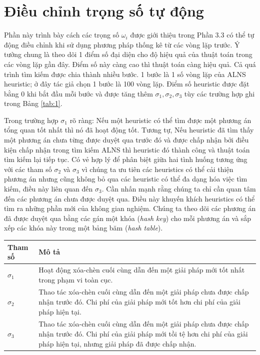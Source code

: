 \section{Điều chỉnh trọng số tự động}
Phần này trình bày cách các trọng số $\omega_i$ được giới thiệu trong Phần 3.3 có thể tự động điều chỉnh khi sử dụng phương pháp thống kê từ các vòng lặp trước. Ý tưởng chung là theo dõi 1 điểm số đại diện cho độ hiệu quả của thuật toán trong các vòng lặp gần đây. Điểm số này càng cao thì thuật toán càng hiệu quả. Cả quá trình tìm kiếm được chia thành nhiều bước. 1 bước là 1 số vòng lặp của ALNS heuristic; ở đây tác giả chọn 1 bước là 100 vòng lặp. Điểm số heuristic được đặt bằng 0 khi bắt đầu mỗi bước và được tăng thêm $\sigma_1, \sigma_2, \sigma_3$ tùy các trường hợp ghi trong Bảng \ref{tab:1}.

Trong trường hợp $\sigma_1$ rõ ràng: Nếu một heuristic có thể tìm được một phương án tổng quan tốt nhất thì nó đã hoạt động tốt. Tương tự, Nếu heuristic  đã tìm thấy một phương án chưa từng được duyệt qua trước đó và được chấp nhận bởi điều kiện chấp nhận trong tìm kiếm ALNS thì heuristic đó thành công và thuật toán tìm kiếm lại tiếp tục. Có vẻ hợp lý để phân biệt giữa hai tình huống tương ứng với các tham số $\sigma_2$ và $\sigma_3$ vì chúng ta ưu tiên các heuristics có thể cải thiện phương án nhưng cũng không bỏ qua các heuristic có thể đa dạng hóa việc tìm kiếm, điều này liên quan đến $\sigma_3$. Cần nhấn mạnh rằng chúng ta chỉ cần quan tâm đến các phương án chưa được duyệt qua. Điều này khuyến khích heuristics có thể tìm ra những phần mới của không gian nghiệm. Chúng ta theo dõi các phương án đã được duyệt qua bằng các gán một khóa (\textit{hash key}) cho mỗi phương án và sắp xếp các khóa này trong một bảng băm (\textit{hash table}).

\begin{table}[caption={Kết quả tốt nhất, 200 địa điểm}, label=tab:1]
            \begin{tabular}{lp{10cm}}
            \hline
            Tham số     &   Mô tả \\
            \hline
            $\sigma_1$  &   Hoạt động xóa-chèn cuối cùng dẫn đến một giải pháp mới tốt nhất trong phạm vi toàn cục. \\
            $\sigma_2$  &   Thao tác xóa-chèn cuối cùng dẫn đến một giải pháp chưa được chấp nhận trước đó. Chi phí của giải pháp mới tốt hơn chi phí của giải pháp hiện tại. \\
            $\sigma_3$  &   Thao tác xóa-chèn cuối cùng dẫn đến một giải pháp chưa được chấp nhận trước đó. Chi phí của giải pháp mới tồi tệ hơn chi phí của giải pháp hiện tại, nhưng giải pháp đã được chấp nhận. \\
            \hline
        \end{tabular} \\
\end{table}

